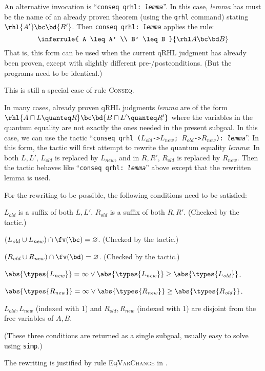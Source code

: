 \documentclass{article}
\renewcommand\ruleref[1]{rule \hbox{\textsc{#1}}}
\begin{document}
\bigskip

An alternative invocation is ``\texttt{conseq qrhl:\
  \textit{lemma}}''. In this case, \textit{lemma} has must be the name
of an already proven theorem (using the \texttt{qrhl} command) stating
$\rhl{A'}\bc\bd{B'}$. Then \texttt{conseq qrhl:\ \textit{lemma}} applies the rule:
\[
  \inferrule{
    A \leq A' \\
    B' \leq B
  }{
    \rhl A\bc\bd B
  }
\]
That is, this form can be used when the current qRHL judgment has
already been proven, except with slightly different
pre-/postconditions. (But the programs need to be
identical.)

This is still a special case of \ruleref{Conseq}.


\bigskip

In many cases, already proven qRHL judgments \textit{lemma} are of the
form $\rhl{A \sqcap L\quanteq R}\bc\bd {B \sqcap L'\quanteq R'}$ where
the variables in the quantum equality are not exactly the ones needed
in the present subgoal. In this case, we can use the tactic
``\texttt{conseq qrhl ($L_\mathit{old}$->$L_\mathit{new}$;
  $R_\mathit{old}$->$R_\mathit{new}$): \textit{lemma}}''.  In this
form, the tactic will first attempt to rewrite the quantum equality
\textit{lemma}: In both $L,L'$, $L_\mathit{old}$ is replaced by
$L_\mathit{new}$, and in $R,R'$, $R_\mathit{old}$ is replaced by
$R_\mathit{new}$.  Then the tactic behaves like ``\texttt{conseq qrhl:
  \textit{lemma}}'' above except that the rewritten lemma is used.

For the rewriting to be possible, the following conditions need to be
satisfied:
\begin{compactitem}
\item $L_\mathit{old}$ is a suffix of both $L,L'$. $R_\mathit{old}$ is a suffix of both $R,R'$.
   (Checked by the tactic.)
\item $(L_\mathit{old}\cup L_\mathit{new}) \cap \fv(\bc) = \varnothing$. (Checked by the tactic.)
\item $(R_\mathit{old}\cup R_\mathit{new}) \cap \fv(\bd) = \varnothing$. (Checked by the tactic.)
\item
  \begin{compactitem}
    \item $\abs{\types{L_{\mathit{new}}}} = \infty \vee \abs{\types{L_\mathit{new}}} \geq \abs{\types{L_\mathit{old}}}$.
    \item $\abs{\types{R_{\mathit{new}}}} = \infty \vee \abs{\types{R_\mathit{new}}} \geq \abs{\types{R_\mathit{old}}}$.
    \item $L_{\mathit{old}}, L_{\mathit{new}}$ (indexed with 1) and
       $R_{\mathit{old}}, R_{\mathit{new}}$ (indexed with 1) are disjoint from the free variables of $A,B$.
  \end{compactitem}
  (These three conditions are returned as a single subgoal, usually easy to solve using \texttt{simp}.)
\end{compactitem}
The rewriting is justified by \ruleref{EqVarChange} in \cite{local-variables}.
\end{document}
